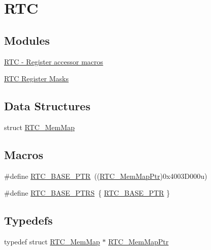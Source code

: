 \hypertarget{group___r_t_c___peripheral}{}\section{R\+T\+C}
\label{group___r_t_c___peripheral}
\subsection*{Modules}
\begin{DoxyCompactItemize}
\item 
\hyperlink{group___r_t_c___register___accessor___macros}{R\+T\+C -\/ Register accessor macros}
\item 
\hyperlink{group___r_t_c___register___masks}{R\+T\+C Register Masks}
\end{DoxyCompactItemize}
\subsection*{Data Structures}
\begin{DoxyCompactItemize}
\item 
struct \hyperlink{struct_r_t_c___mem_map}{R\+T\+C\+\_\+\+Mem\+Map}
\end{DoxyCompactItemize}
\subsection*{Macros}
\begin{DoxyCompactItemize}
\item 
\#define \hyperlink{group___r_t_c___peripheral_ga6455e2b767b4b224b4f00b50e87a2441}{R\+T\+C\+\_\+\+B\+A\+S\+E\+\_\+\+P\+T\+R}~((\hyperlink{group___r_t_c___peripheral_gac92da66fe1171e5751505df29917b152}{R\+T\+C\+\_\+\+Mem\+Map\+Ptr})0x4003\+D000u)
\item 
\#define \hyperlink{group___r_t_c___peripheral_ga426dff8af34f3304d58b5bed5a54e583}{R\+T\+C\+\_\+\+B\+A\+S\+E\+\_\+\+P\+T\+R\+S}~\{ \hyperlink{group___r_t_c___peripheral_ga6455e2b767b4b224b4f00b50e87a2441}{R\+T\+C\+\_\+\+B\+A\+S\+E\+\_\+\+P\+T\+R} \}
\end{DoxyCompactItemize}
\subsection*{Typedefs}
\begin{DoxyCompactItemize}
\item 
typedef struct \hyperlink{struct_r_t_c___mem_map}{R\+T\+C\+\_\+\+Mem\+Map} $\ast$ \hyperlink{group___r_t_c___peripheral_gac92da66fe1171e5751505df29917b152}{R\+T\+C\+\_\+\+Mem\+Map\+Ptr}
\end{DoxyCompactItemize}



